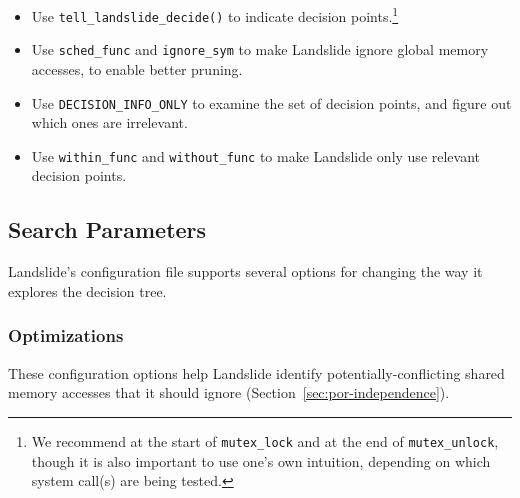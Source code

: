 \begin{itemize}
        \item Use \texttt{tell\_landslide\_decide()} to indicate decision points.\footnote{
	We recommend at the start of \texttt{mutex\_lock} and at the end of \texttt{mutex\_unlock}, though it is also important to use one's own intuition, depending on which system call(s) are being tested.}
        \item Use \texttt{sched\_func} and \texttt{ignore\_sym} to make Landslide ignore global memory accesses, to enable better pruning.
        \item Use \texttt{DECISION\_INFO\_ONLY} to examine the set of decision points, and figure out which ones are irrelevant.
        \item Use \texttt{within\_func} and \texttt{without\_func} to make Landslide only use relevant decision points.
\end{itemize}

\subsection{Search Parameters}
\label{sec:using-search}

Landslide's configuration file supports several options for changing the way it explores the decision tree.

\subsubsection{Optimizations}

These configuration options help Landslide identify potentially-conflicting shared memory accesses that it should ignore (Section~\ref{sec:por-independence}).

